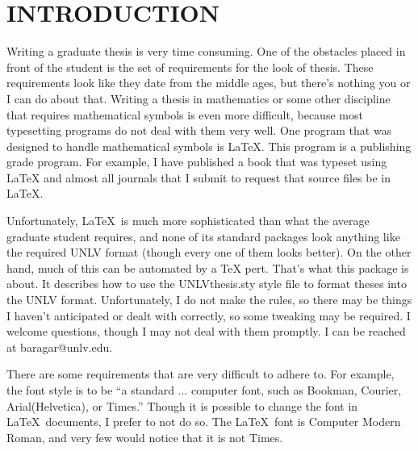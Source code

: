 \chapter{INTRODUCTION}%

Writing a graduate thesis is very time consuming.  One of the
obstacles placed in front of the student is the set of
requirements for the look of thesis.  These requirements look like
they date from the middle ages, but there's nothing you or I can
do about that.  Writing a thesis in mathematics or some other
discipline that requires mathematical symbols is even more
difficult, because most typesetting programs do not deal with them
very well.  One program that was designed to handle mathematical
symbols is \LaTeX.  This program is a publishing grade program.
For example, I have published a book that was typeset using \LaTeX
\cite{B1} and almost all journals that I submit to request that
source files be in \LaTeX.

Unfortunately, \LaTeX\ is much more sophisticated than what the
average graduate student requires, and none of its standard
packages look anything like the required UNLV format (though every
one of them looks better). On the other hand, much of this can be
automated by a \TeX\! pert. That's what this package is about.  It
describes how to use the UNLVthesis.sty style file to format
theses into the UNLV format. Unfortunately, I do not make the
rules, so there may be things I haven't anticipated or dealt with
correctly, so some tweaking may be required.  I welcome questions,
though I may not deal with them promptly.  I can be reached at
baragar@unlv.edu.

There are some requirements that are very difficult to adhere to.
For example, the font style is to be ``a standard ... computer
font, such as Bookman, Courier, Arial(Helvetica), or Times.''
Though it is possible to change the font in \LaTeX\ documents, I
prefer to not do so.  The \LaTeX\ font is Computer Modern Roman,
and very few would notice that it is not Times.
